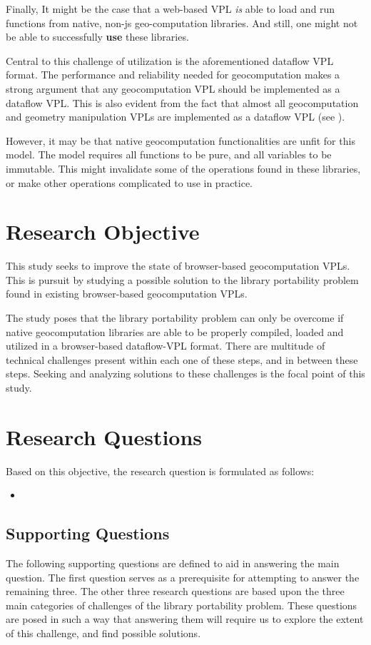 Finally, It might be the case that a web-based VPL \emph{is} able to load and run functions from native, non-js geo-computation libraries. 
And still, one might not be able to successfully \textbf{use} these libraries.

Central to this challenge of utilization is the aforementioned dataflow VPL format. 
The performance and reliability needed for geocomputation makes a strong argument that any geocomputation VPL should be implemented as a dataflow VPL. 
This is also evident from the fact that almost all geocomputation and geometry manipulation VPLs are implemented as a dataflow VPL (see ).

However, it may be that native geocomputation functionalities are unfit for this model. 
The model requires all functions to be pure, and all variables to be immutable. 
This might invalidate some of the operations found in these libraries, or make other operations complicated to use in practice.



\section{Research Objective}
This study seeks to improve the state of browser-based geocomputation VPLs.
This is pursuit by studying a possible solution to the library portability problem found in existing browser-based geocomputation VPLs.

The study poses that the library portability problem can only be overcome if native geocomputation libraries are able to be properly compiled, loaded and utilized in a browser-based dataflow-VPL format. 
There are multitude of technical challenges present within each one of these steps, and in between these steps. 
Seeking and analyzing solutions to these challenges is the focal point of this study. 


\section{Research Questions}
Based on this objective, the research question is formulated as follows: 
\begin{itemize}[ ]
  \item \myMainRQ
\end{itemize}


\subsection*{Supporting Questions}
The following supporting questions are defined to aid in answering the main question.
The first question serves as a prerequisite for attempting to answer the remaining three. 
The other three research questions are based upon the three main categories of challenges of the library portability problem.  
These questions are posed in such a way that answering them will require us to explore the extent of this challenge, and find possible solutions.


